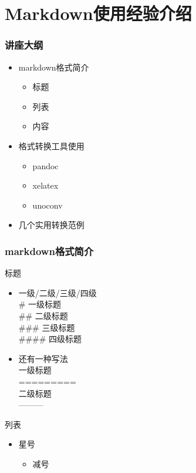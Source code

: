 \section{Markdown使用经验介绍}

\begin{frame}\frametitle{讲座大纲}

\begin{itemize}
\item
  markdown格式简介
  \begin{itemize}
  \item
    标题
  \item
    列表
  \item
    内容
  \end{itemize}
\item
  格式转换工具使用
  \begin{itemize}
  \item
    pandoc
  \item
    xelatex
  \item
    unoconv
  \end{itemize}
\item
  几个实用转换范例
\end{itemize}
\end{frame}

\begin{frame}\frametitle{markdown格式简介}

\begin{block}{标题}

\begin{itemize}
\item
  一级/二级/三级/四级\\ \# 一级标题\\ \#\# 二级标题\\ \#\#\# 三级标题\\
  \#\#\#\# 四级标题
\item
  还有一种写法\\ 一级标题\\ =========\\ 二级标题\\ ---------
\end{itemize}
\end{block}

\begin{block}{列表}

\begin{itemize}
\item
  星号
  \begin{itemize}
  \item
    减号
  \end{itemize}
\end{itemize}
\end{block}

\end{frame}

